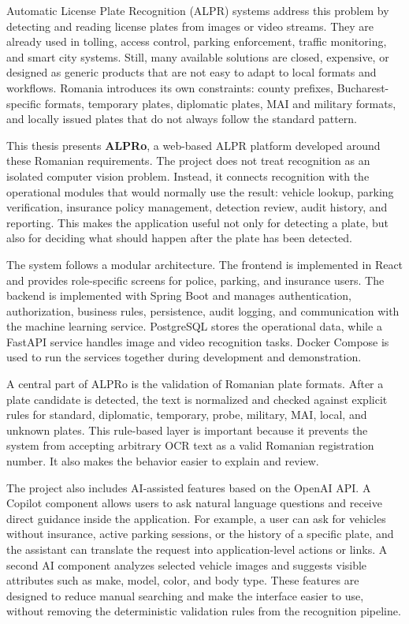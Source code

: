 ﻿\documentclass[12pt,a4paper]{article}
\begin{document}
Automatic License Plate Recognition (ALPR) systems address this problem by detecting and reading license plates from images or video streams. They are already used in tolling, access control, parking enforcement, traffic monitoring, and smart city systems. Still, many available solutions are closed, expensive, or designed as generic products that are not easy to adapt to local formats and workflows. Romania introduces its own constraints: county prefixes, Bucharest-specific formats, temporary plates, diplomatic plates, MAI and military formats, and locally issued plates that do not always follow the standard pattern.

This thesis presents \textbf{ALPRo}, a web-based ALPR platform developed around these Romanian requirements. The project does not treat recognition as an isolated computer vision problem. Instead, it connects recognition with the operational modules that would normally use the result: vehicle lookup, parking verification, insurance policy management, detection review, audit history, and reporting. This makes the application useful not only for detecting a plate, but also for deciding what should happen after the plate has been detected.

The system follows a modular architecture. The frontend is implemented in React and provides role-specific screens for police, parking, and insurance users. The backend is implemented with Spring Boot and manages authentication, authorization, business rules, persistence, audit logging, and communication with the machine learning service. PostgreSQL stores the operational data, while a FastAPI service handles image and video recognition tasks. Docker Compose is used to run the services together during development and demonstration.

A central part of ALPRo is the validation of Romanian plate formats. After a plate candidate is detected, the text is normalized and checked against explicit rules for standard, diplomatic, temporary, probe, military, MAI, local, and unknown plates. This rule-based layer is important because it prevents the system from accepting arbitrary OCR text as a valid Romanian registration number. It also makes the behavior easier to explain and review.

The project also includes AI-assisted features based on the OpenAI API. A Copilot component allows users to ask natural language questions and receive direct guidance inside the application. For example, a user can ask for vehicles without insurance, active parking sessions, or the history of a specific plate, and the assistant can translate the request into application-level actions or links. A second AI component analyzes selected vehicle images and suggests visible attributes such as make, model, color, and body type. These features are designed to reduce manual searching and make the interface easier to use, without removing the deterministic validation rules from the recognition pipeline.
\end{document}
